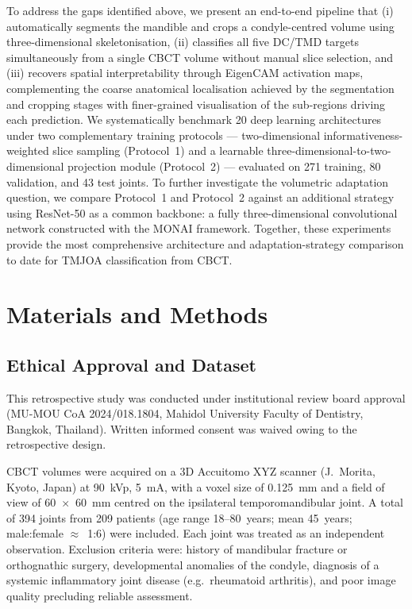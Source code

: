 \documentclass[review,12pt]{elsarticle}
\begin{document}
To address the gaps identified above, we present an end-to-end pipeline that (i) automatically segments the mandible and crops a condyle-centred volume using three-dimensional skeletonisation, (ii) classifies all five DC/TMD targets simultaneously from a single CBCT volume without manual slice selection, and (iii) recovers spatial interpretability through EigenCAM \cite{muhammad2020eigen} activation maps, complementing the coarse anatomical localisation achieved by the segmentation and cropping stages with finer-grained visualisation of the sub-regions driving each prediction. We systematically benchmark 20 deep learning architectures under two complementary training protocols --- two-dimensional informativeness-weighted slice sampling (Protocol~1) and a learnable three-dimensional-to-two-dimensional projection module (Protocol~2) --- evaluated on 271 training, 80 validation, and 43 test joints. To further investigate the volumetric adaptation question, we compare Protocol~1 and Protocol~2 against an additional strategy using ResNet-50 as a common backbone: a fully three-dimensional convolutional network constructed with the MONAI framework. Together, these experiments provide the most comprehensive architecture and adaptation-strategy comparison to date for TMJOA classification from CBCT.

\section{Materials and Methods}
\label{sec:methods}

\subsection{Ethical Approval and Dataset}
\label{sec:data}

This retrospective study was conducted under institutional review board
approval (MU-MOU CoA 2024/018.1804, Mahidol University Faculty of
Dentistry, Bangkok, Thailand). Written informed consent was waived owing
to the retrospective design.

CBCT volumes were acquired on a 3D Accuitomo XYZ scanner (J.~Morita,
Kyoto, Japan) at 90~kVp, 5~mA, with a voxel size of 0.125~mm and a
field of view of 60~$\times$~60~mm centred on the ipsilateral
temporomandibular joint. A total of 394 joints from 209 patients (age
range 18--80~years; mean 45~years; male:female $\approx$~1:6) were
included. Each joint was treated as an independent observation. Exclusion
criteria were: history of mandibular fracture or orthognathic surgery,
developmental anomalies of the condyle, diagnosis of a systemic
inflammatory joint disease (e.g.\ rheumatoid arthritis), and poor
image quality precluding reliable assessment.
\end{document}
